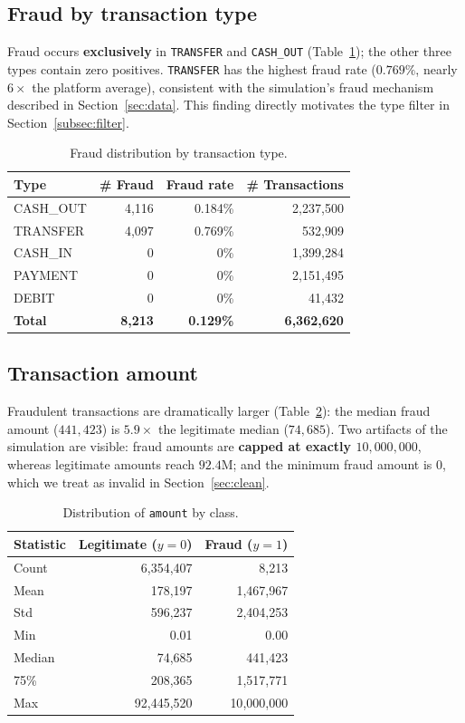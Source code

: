 \documentclass{article}
\begin{document}
\subsection{Fraud by transaction type}
Fraud occurs \textbf{exclusively} in \texttt{TRANSFER} and
\texttt{CASH\_OUT} (Table~\ref{tab:bytype}); the other three types
contain zero positives. \texttt{TRANSFER} has the highest fraud rate
($0.769\%$, nearly $6\times$ the platform average), consistent with the
simulation's fraud mechanism described in Section~\ref{sec:data}. This
finding directly motivates the type filter in
Section~\ref{subsec:filter}.

\begin{table}[H]
\centering
\caption{Fraud distribution by transaction type.}
\label{tab:bytype}
\begin{tabular}{lrrr}
\toprule
Type & \# Fraud & Fraud rate & \# Transactions \\
\midrule
CASH\_OUT & 4{,}116 & 0.184\% & 2{,}237{,}500 \\
TRANSFER  & 4{,}097 & 0.769\% & 532{,}909 \\
CASH\_IN  & 0       & 0\%     & 1{,}399{,}284 \\
PAYMENT   & 0       & 0\%     & 2{,}151{,}495 \\
DEBIT     & 0       & 0\%     & 41{,}432 \\
\midrule
\textbf{Total} & \textbf{8{,}213} & \textbf{0.129\%} & \textbf{6{,}362{,}620} \\
\bottomrule
\end{tabular}
\end{table}

\subsection{Transaction amount}
Fraudulent transactions are dramatically larger
(Table~\ref{tab:amount}): the median fraud amount ($441{,}423$) is
$5.9\times$ the legitimate median ($74{,}685$). Two artifacts of the
simulation are visible: fraud amounts are \textbf{capped at exactly
$10{,}000{,}000$}, whereas legitimate amounts reach $92.4$M; and the
minimum fraud amount is $0$, which we treat as invalid in
Section~\ref{sec:clean}.

\begin{table}[H]
\centering
\caption{Distribution of \texttt{amount} by class.}
\label{tab:amount}
\begin{tabular}{lrr}
\toprule
Statistic & Legitimate ($y{=}0$) & Fraud ($y{=}1$) \\
\midrule
Count  & 6{,}354{,}407 & 8{,}213 \\
Mean   & 178{,}197     & 1{,}467{,}967 \\
Std    & 596{,}237     & 2{,}404{,}253 \\
Min    & 0.01          & 0.00 \\
Median & 74{,}685      & 441{,}423 \\
75\%   & 208{,}365     & 1{,}517{,}771 \\
Max    & 92{,}445{,}520 & 10{,}000{,}000 \\
\bottomrule
\end{tabular}
\end{table}
\end{document}

